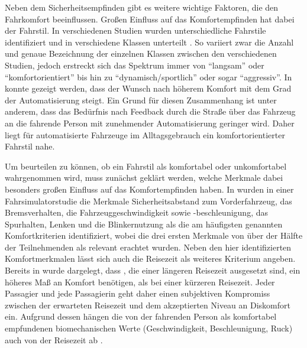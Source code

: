 Neben dem Sicherheitsempfinden gibt es weitere wichtige Faktoren, die den Fahrkomfort beeinflussen. Großen Einfluss auf das Komfortempfinden hat dabei der Fahrstil. In verschiedenen Studien wurden unterschiedliche Fahrstile identifiziert und in verschiedene Klassen unterteilt \cite{Abendroth.2012,Bellem.2016,Murphey.30.03.200902.04.2009}. So variiert zwar die Anzahl und genaue Bezeichnung der einzelnen Klassen zwischen den verschiedenen Studien, jedoch erstreckt sich das Spektrum immer von ``langsam'' oder ``komfortorientiert'' bis hin zu ``dynamisch/sportlich'' oder sogar ``aggressiv''. In \cite{Lange.2014} konnte gezeigt werden, dass der Wunsch nach höherem Komfort mit dem Grad der Automatisierung steigt. Ein Grund für diesen Zusammenhang ist unter anderem, dass das Bedürfnis nach Feedback durch die Straße über das Fahrzeug an die fahrende Person mit zunehmender Automatisierung geringer wird. Daher liegt für automatisierte Fahrzeuge im Alltagsgebrauch ein komfortorientierter Fahrstil nahe. 

Um beurteilen zu können, ob ein Fahrstil als komfortabel oder unkomfortabel wahrgenommen wird, muss zunächst geklärt werden, welche Merkmale dabei besonders großen Einfluss auf das Komfortempfinden haben. In \cite{Scherer.2015} wurden in einer Fahrsimulatorstudie die Merkmale Sicherheitsabstand zum Vorderfahrzeug, das Bremsverhalten, die Fahrzeuggeschwindigkeit sowie -beschleunigung, das Spurhalten, Lenken und die Blinkernutzung als die am häufigsten genannten Komfortkriterien identifiziert, wobei die drei ersten Merkmale von über der Hälfte der Teilnehmenden als relevant erachtet wurden. Neben den hier identifizierten Komfortmerkmalen lässt sich auch die Reisezeit als weiteres Kriterium angeben. Bereits in \cite{Oborne.1978} wurde dargelegt, dass , die einer längeren Reisezeit ausgesetzt sind, ein höheres Maß an Komfort benötigen, als bei einer kürzeren Reisezeit. Jeder Passagier und jede Passagierin geht daher einen subjektiven Kompromiss zwischen der erwarteten Reisezeit und dem akzeptierten Niveau an Diskomfort ein. Aufgrund dessen hängen die von der fahrenden Person als komfortabel empfundenen biomechanischen Werte (Geschwindigkeit, Beschleunigung, Ruck) auch von der Reisezeit ab \cite{Festner.2019}.

